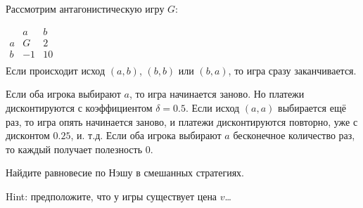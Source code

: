 \begin{problem}
Рассмотрим антагонистическую игру $G$:

$\begin{array}{|c|c|c|}
& a & b \\
a & G & 2 \\
b & -1 & 10 \\
\end{array}$ \\
Если происходит исход $(a,b)$, $(b,b)$ или $(b,a)$, то игра сразу заканчивается. \par
Если оба игрока выбирают $a$, то игра начинается заново. Но платежи дисконтируются с коэффициентом $\delta=0.5$. Если исход $(a,a)$ выбирается ещё раз, то игра опять начинается заново, и платежи дисконтируются повторно, уже с дисконтом $0.25$, и. т.д. Если оба игрока выбирают $a$ бесконечное количество раз, то каждый получает полезность 0. \par
Найдите равновесие по Нэшу в смешанных стратегиях. \par
Hint: предположите, что у игры существует цена $v$\ldots



\begin{sol}

\end{sol}
\end{problem}








